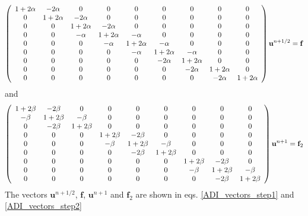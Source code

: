 \begin{align}
  \left(\begin{array}{c c c c c c c c c}
        1+2\alpha & -2\alpha &0 &0 &0 &0 &0 &0 &0\\
        0 & 1+2\alpha & -2\alpha &0 &0 &0 &0 &0 &0\\
        0& 0 & 1+2\alpha & -2\alpha & 0 & 0 &0&0&0\\
        0& 0&-\alpha & 1+2\alpha & -\alpha & 0 & 0 &0&0\\
        0& 0&0&-\alpha & 1+2\alpha & -\alpha & 0 & 0 &0\\
        0& 0&0&0&-\alpha & 1+2\alpha & -\alpha & 0 &0\\
        0& 0 &0 &0 &0&-2\alpha & 1+2\alpha & 0&0\\
        0& 0 &0 &0 &0&0&-2\alpha & 1+2\alpha &0\\
         0&0 &0 &0&0 &0&0&-2\alpha & 1+2\alpha
       \end{array}\right)\mathbf{u}^{n+1/2} = \mathbf{f}
\end{align}
and
\begin{align}
  \left(\begin{array}{c c c c c c c c c}
        1+2\beta & -2\beta &0 &0 &0 &0 &0 &0 &0\\
        -\beta & 1+2\beta & -\beta &0 &0 &0 &0 &0 &0\\
        0& -2\beta & 1+2\beta & 0 & 0 & 0 &0&0&0\\
        0& 0&0 & 1+2\beta & -2\beta & 0 & 0 &0&0\\
        0& 0&0&-\beta & 1+2\beta & -\beta & 0 & 0 &0\\
        0& 0&0&0&-2\beta & 1+2\beta & 0 & 0 &0\\
        0& 0 &0 &0 &0&0 & 1+2\beta & -2\beta&0\\
        0& 0 &0 &0 &0&0&-\beta & 1+2\beta &-\beta\\
         0&0 &0 &0&0 &0&0&-2\beta & 1+2\beta
       \end{array}\right)\mathbf{u}^{n+1} = \mathbf{f}_2
\end{align}
The vectors $\mathbf{u}^{n+1/2}$, $\mathbf{f}$, $\mathbf{u}^{n+1}$ and $\mathbf{f}_2$ are shown in eqs. \ref{ADI_vectors_step1} and \ref{ADI_vectors_step2}
